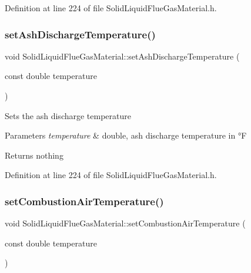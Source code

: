 Definition at line 224 of file Solid\+Liquid\+Flue\+Gas\+Material.\+h.

\mbox{\label{class_solid_liquid_flue_gas_material_ad29543a88737c3d051c7d824287bc791}} 
\subsubsection{\texorpdfstring{set\+Ash\+Discharge\+Temperature()}{setAshDischargeTemperature()}\hspace{0.1cm}{\footnotesize\ttfamily [3/3]}}
{\footnotesize\ttfamily void Solid\+Liquid\+Flue\+Gas\+Material\+::set\+Ash\+Discharge\+Temperature (\begin{DoxyParamCaption}\item[{const double}]{temperature }\end{DoxyParamCaption})\hspace{0.3cm}{\ttfamily [inline]}}

Sets the ash discharge temperature 
\begin{DoxyParams}{Parameters}
{\em temperature} & double, ash discharge temperature in °F \\
\hline
\end{DoxyParams}
\begin{DoxyReturn}{Returns}
nothing 
\end{DoxyReturn}


Definition at line 224 of file Solid\+Liquid\+Flue\+Gas\+Material.\+h.

\mbox{\label{class_solid_liquid_flue_gas_material_a626dfbc9ba87abff99e5c5a8204d69c6}} 
\subsubsection{\texorpdfstring{set\+Combustion\+Air\+Temperature()}{setCombustionAirTemperature()}\hspace{0.1cm}{\footnotesize\ttfamily [1/3]}}
{\footnotesize\ttfamily void Solid\+Liquid\+Flue\+Gas\+Material\+::set\+Combustion\+Air\+Temperature (\begin{DoxyParamCaption}\item[{const double}]{temperature }\end{DoxyParamCaption})\hspace{0.3cm}{\ttfamily [inline]}}

